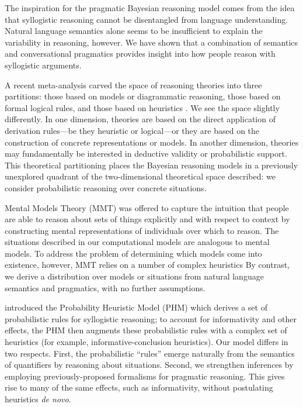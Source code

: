 \documentclass[10pt,letterpaper]{article}
\begin{document}
The inspiration for the pragmatic Bayesian reasoning model comes from the idea that syllogistic reasoning cannot be disentangled from language understanding. Natural language semantics alone seems to be insufficient to explain the variability in reasoning, however. We have shown that a combination of semantics and conversational pragmatics provides insight into how people reason with syllogistic arguments. 

A recent meta-analysis carved the space of reasoning theories into three partitions: those based on models or diagrammatic reasoning, those based on formal logical rules, and those based on heuristics \cite{Khemlani2012}. We see the space slightly differently. In one dimension, theories are based on the direct application of derivation rules---be they heuristic or logical---or they are based on the construction of concrete representations or models. In another dimension, theories may fundamentally be interested in deductive validity or probabilistic support. This theoretical partitioning places the Bayesian reasoning models in a previously unexplored quadrant of the two-dimensional theoretical space described: we consider probabilistic reasoning over concrete situations.

Mental Models Theory (MMT) was offered to capture the intuition that people are able to reason about sets of things explicitly and with respect to context by constructing mental representations of individuals over which to reason. The situations described in our computational models are analogous to mental models. To address the problem of determining which models come into existence, however, MMT relies on a number of complex heuristics  By contrast, we derive a distribution over models or situations from natural language semantics and pragmatics, with no further assumptions.


 introduced the Probability Heuristic Model (PHM) which derives a set of probabilistic rules for syllogistic reasoning; to account for informativity and other effects, the PHM then augments these probabilistic rules with a complex set of heuristics (for example, informative-conclusion heuristics). Our model differs in two respects. First, the probabilistic ``rules'' emerge naturally from the semantics of quantifiers by reasoning about situations. Second, we strengthen inferences by employing previously-proposed formalisms for pragmatic reasoning. This gives rise to many of the same effects, such as informativity, without postulating heuristics \emph{de novo}.
\end{document}
